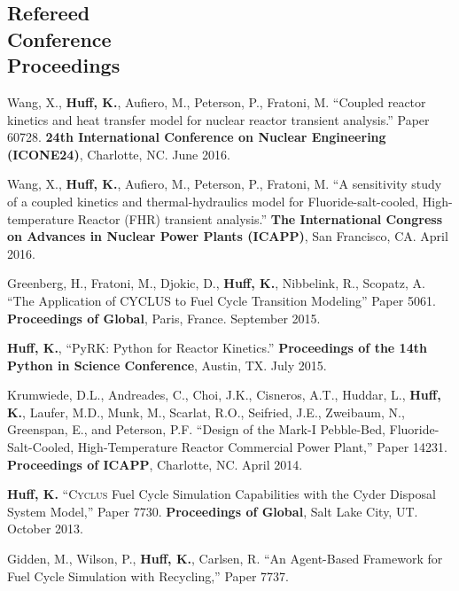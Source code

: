 \documentclass[margin,line]{resume}
\newcommand{\Cyclus}{\textsc{Cyclus}\xspace}%
\begin{document}
\begin{resume}
    \section{\mysidestyle Refereed\\Conference\\Proceedings}
    \begin{bibenum}
      \item Wang, X., \textbf{Huff, K.}, Aufiero, M., Peterson, P., Fratoni, M.
            ``Coupled reactor kinetics and heat transfer model for nuclear 
            reactor transient analysis.'' Paper 60728.  \textbf{24th 
            International Conference on Nuclear Engineering (ICONE24)}, 
            Charlotte, NC.  June 2016.
      \item Wang, X., \textbf{Huff, K.}, Aufiero, M., Peterson, P., Fratoni, M.
            ``A sensitivity study of a coupled kinetics and thermal-hydraulics 
            model for Fluoride-salt-cooled, High-temperature Reactor (FHR) 
            transient analysis.'' \textbf{The International 
            Congress on Advances in Nuclear Power Plants (ICAPP)}, San 
            Francisco, CA. April 2016.
      \item Greenberg, H., Fratoni, M., Djokic, D., \textbf{Huff, K.},
         Nibbelink, R., Scopatz, A. ``The Application of CYCLUS to Fuel Cycle
         Transition Modeling'' Paper 5061.
         \textbf{Proceedings of Global}, Paris, France. September 2015.
      \item \textbf{Huff, K.}, ``PyRK: Python for Reactor Kinetics.''
         \textbf{Proceedings of the 14th Python in Science Conference}, Austin,
         TX. July 2015.
      \item Krumwiede, D.L., Andreades, C., Choi, J.K., Cisneros, A.T., Huddar, L.,
         \textbf{Huff, K.}, Laufer, M.D., Munk, M., Scarlat, R.O., Seifried, J.E.,
         Zweibaum, N., Greenspan, E., and Peterson, P.F.  ``Design of the Mark-I
         Pebble-Bed, Fluoride-Salt-Cooled, High-Temperature Reactor Commercial Power
         Plant,'' Paper 14231.  \textbf{Proceedings of ICAPP}, Charlotte, NC. April 2014.
      \item \textbf{Huff, K.} ``\Cyclus Fuel Cycle Simulation Capabilities with the Cyder Disposal System Model,'' Paper 7730.
         \textbf{Proceedings of Global}, Salt Lake City, UT. October 2013.
      \item Gidden, M., Wilson, P., \textbf{Huff, K.}, Carlsen, R. ``An Agent-Based Framework for Fuel Cycle Simulation with Recycling,'' Paper 7737.

\end{bibenum}
\end{resume}
\end{document}

